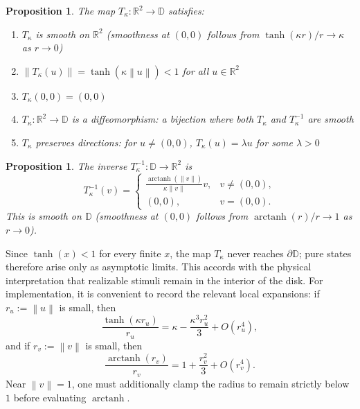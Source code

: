 \documentclass[11pt]{article}
\theoremstyle{plain}
\newtheorem{proposition}[theorem]{Proposition}
\theoremstyle{definition}
\theoremstyle{remark}
\newcommand{\R}{\mathbb{R}}
\newcommand{\D}{\mathbb{D}}
\newcommand{\norm}[1]{\left\lVert #1 \right\rVert}
\DeclareMathOperator{\arctanh}{arctanh}
\begin{document}
\begin{proposition}
\label{prop:compression-props}
The map $T_\kappa: \R^2 \to \D$ satisfies:
\begin{enumerate}[label=(\roman*)]
    \item $T_\kappa$ is smooth on $\R^2$ (smoothness at $(0,0)$ follows from $\tanh(\kappa r)/r \to \kappa$ as $r \to 0$)
    \item $\norm{T_\kappa(u)} = \tanh(\kappa\norm{u}) < 1$ for all $u \in \R^2$
    \item $T_\kappa(0,0) = (0,0)$
    \item $T_\kappa: \R^2 \to \D$ is a diffeomorphism: a bijection where both $T_\kappa$ and $T_\kappa^{-1}$ are smooth
    \item $T_\kappa$ preserves directions: for $u \neq (0,0)$, $T_\kappa(u) = \lambda u$ for some $\lambda > 0$
\end{enumerate}
\end{proposition}

\begin{proposition}
\label{prop:inverse-T}
The inverse $T_\kappa^{-1}: \D \to \R^2$ is
\begin{equation}
T_\kappa^{-1}(v) = \begin{cases}
\displaystyle \frac{\arctanh(\norm{v})}{\kappa \norm{v}} v, & v \neq (0,0), \\[0.8em]
(0,0), & v = (0,0).
\end{cases}
\end{equation}
This is smooth on $\D$ (smoothness at $(0,0)$ follows from $\arctanh(r)/r \to 1$ as $r \to 0$).
\end{proposition}

Since $\tanh(x) < 1$ for every finite $x$, the map $T_\kappa$ never reaches $\partial \D$; pure states therefore arise only as asymptotic limits. This accords with the physical interpretation that realizable stimuli remain in the interior of the disk. For implementation, it is convenient to record the relevant local expansions: if $r_u := \norm{u}$ is small, then
\begin{equation}
\frac{\tanh(\kappa r_u)}{r_u} = \kappa - \frac{\kappa^3 r_u^2}{3} + O(r_u^4),
\end{equation}
and if $r_v := \norm{v}$ is small, then
\begin{equation}
\frac{\arctanh(r_v)}{r_v} = 1 + \frac{r_v^2}{3} + O(r_v^4).
\end{equation}
Near $\norm{v} = 1$, one must additionally clamp the radius to remain strictly below $1$ before evaluating $\arctanh$.
\end{document}
